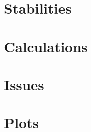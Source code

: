 \begin{appendix}
	\chapter{Stabilities}\label{app:stabilities}
		
	\chapter{Calculations}
		
	\chapter{Issues}
		
	\chapter{Plots}
		
		
\end{appendix}